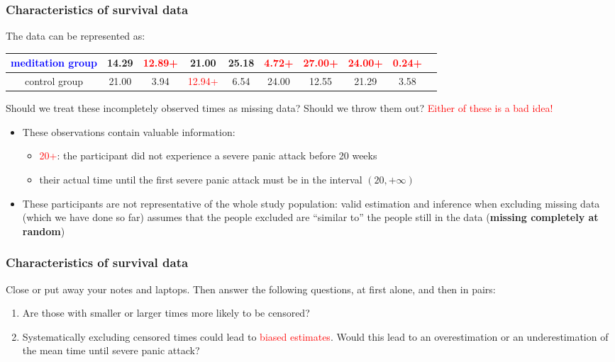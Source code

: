 \documentclass[12pt, 
hyperref={colorlinks=true, linkcolor=blue, urlcolor=cyan},dvipsnames]{beamer}
\begin{document}
\begin{frame}
\frametitle{Characteristics of survival data}
{\fontsize{10pt}{7.2}\selectfont
The data can be represented as:
\hspace*{-1cm}\begin{tabular}{|c|c|c|c|c|c|c|c|c|c|}
\hline
\textcolor{blue}{meditation group} & 14.29  & \textcolor{red}{12.89+} & 21.00  & 25.18  &  \textcolor{red}{4.72+} & \textcolor{red}{27.00+} & \textcolor{red}{24.00+} &  \textcolor{red}{0.24+}  \\
\hline
control group & 21.00  &  3.94  & \textcolor{red}{12.94+} &  6.54  & 24.00  & 12.55  & 21.29  &  3.58 \\
\hline
\end{tabular}
}

\vspace{-0.6cm}
{\small
Should we treat these incompletely observed times as missing data? Should we throw them out? \pause \textcolor{red}{Either of these is a bad idea!} \vspace{-0.3cm}

\begin{itemize}
\item These observations contain valuable information:
{\scriptsize
\begin{itemize}
\item \textcolor{red}{20+}: the participant did not experience a severe panic attack before 20 weeks
\item their actual time until the first severe panic attack must be in the interval $(20, +\infty)$
\end{itemize}
}
\item These participants are not representative of the whole study population: valid estimation and inference when excluding missing data (which we have done so far) assumes that the people excluded are ``similar to'' the people still in the data (\textbf{missing completely at random})
\end{itemize}
}
\end{frame}

\begin{frame}
\frametitle{Characteristics of survival data}
Close or put away your notes and laptops. Then answer the following questions, at first alone, and then in pairs:
\begin{enumerate}
\item Are those with smaller or larger times more likely to be censored?
\item Systematically excluding censored times could lead to \textcolor{red}{biased estimates}. Would this lead to an overestimation or an underestimation of the mean time until severe panic attack?
\end{enumerate}

\end{frame}
\end{document}
